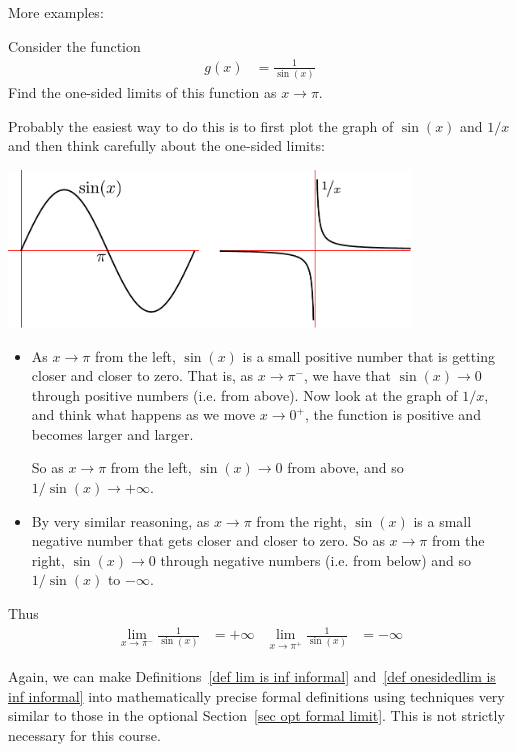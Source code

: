 More examples:
\begin{eg}
Consider the function
\begin{align*}
  g(x) &= \frac{1}{\sin(x)}
\end{align*}
Find the one-sided limits of this function as $x \to \pi$.

Probably the easiest way to do this is to first plot the graph of $\sin(x)$ and
$1/x$ and then think carefully about the one-sided limits:
\begin{efig}
\begin{center}
 \includegraphics[width=0.8\textwidth]{sinx_1onx}
\end{center}
\end{efig}
\begin{itemize}
 \item As $x \to \pi$ from the left, $\sin(x)$ is a small positive number that
is getting closer and closer to zero. That is, as $x \to \pi^-$, we have that
$\sin(x) \to 0$ through positive numbers (i.e. from above). Now look at the graph
of $1/x$, and think what happens as we move $x \to 0^+$, the function is
positive and becomes larger and larger.

So as $x \to \pi$ from the left, $\sin(x) \to 0$ from above, and so $1/\sin(x)
\to +\infty$.

\item By very similar reasoning, as $x \to \pi$ from the right, $\sin(x)$ is a
small negative number that gets closer and closer to zero. So as $x \to \pi$
from the right, $\sin(x) \to 0$ through negative numbers (i.e. from below) and so
$1/\sin(x)$ to $-\infty$.
\end{itemize}
Thus
\begin{align*}
  \lim_{x \to \pi^-} \frac{1}{\sin(x)} &= +\infty &
  \lim_{x \to \pi^+} \frac{1}{\sin(x)} &= -\infty
\end{align*}
\end{eg}


Again, we can make Definitions~\ref{def lim is inf informal}
and~\ref{def onesidedlim is inf informal} into mathematically precise formal
definitions using techniques very similar to those in the optional
Section~\ref{sec opt formal limit}. This is not strictly necessary for this
course.

